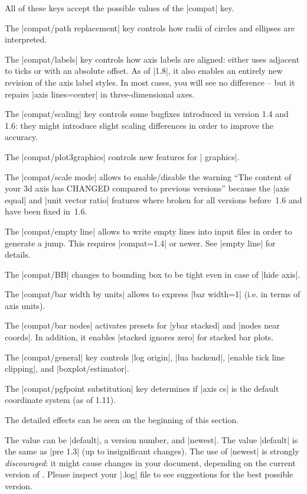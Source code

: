 \begin{pgfplotskey}
\begin{pgfplotskeylist}
        All of these keys accept the possible values of the |compat| key.

        The |compat/path replacement| key controls how radii of circles and
        ellipses are interpreted.

        The |compat/labels| key controls how axis labels are aligned: either
        uses adjacent to ticks or with an absolute offset. As of |1.8|, it also
        enables an entirely new revision of the axis label styles. In most
        cases, you will see no difference -- but it repairs |axis lines=center|
        in three-dimensional axes.

        The |compat/scaling| key controls some bugfixes introduced in version
        1.4 and 1.6: they might introduce slight scaling differences in order
        to improve the accuracy.

        The |compat/plot3graphics| controls new features for
        | graphics|.

        The |compat/scale mode| allows to enable/disable the warning ``The
        content of your 3d axis has CHANGED compared to previous versions''
        because the |axis equal| and |unit vector ratio| features where broken
        for all versions before~1.6 and have been fixed in~1.6.

        The |compat/empty line| allows to write empty lines into input files in
        order to generate a jump. This requires |compat=1.4| or newer. See
        |empty line| for details.

        The |compat/BB| changes to bounding box to be tight even in case of
        |hide axis|.

        The |compat/bar width by units| allows to express |bar width=1| (i.e.\@
        in terms of axis units).

        The |compat/bar nodes| activates presets for |ybar stacked| and
        |nodes near coords|. In addition, it enables |stacked ignores zero| for
        stacked bar plots.

        The |compat/general| key controls |log origin|, |lua backend|,
        |enable tick line clipping|, and |boxplot/estimator|.

        The |compat/pgfpoint substitution| key determines if |axis cs| is the
        default coordinate system (as of 1.11).

        The detailed effects can be seen on the beginning of this section.
    \end{pgfplotskeylist}

    The value  can be |default|, a version number, and |newest|.
    The value |default| is the same as |pre 1.3| (up to insignificant changes).
    The use of |newest| is strongly \emph{discouraged}: it might cause changes
    in your document, depending on the current version of \PGFPlots{}. Please
    inspect your |.log| file to see suggestions for the best possible version.
\end{pgfplotskey}


